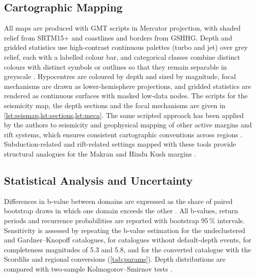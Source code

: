 \documentclass[11pt]{article}
\begin{document}
\subsection{Cartographic Mapping}
All maps are produced with GMT scripts in Mercator projection, with shaded relief
from SRTM15+ and coastlines and borders from GSHHG. Depth and gridded statistics use
high-contrast continuous palettes (turbo and jet) over grey relief, each with a
labelled colour bar, and categorical classes combine distinct colours with distinct
symbols or outlines so that they remain separable in greyscale \cite{Crameri2020}. Hypocentres are coloured by depth and sized by magnitude, focal
mechanisms are drawn as lower-hemisphere projections, and gridded statistics are
rendered as continuous surfaces with masked low-data nodes. The scripts for the
seismicity map, the depth sections and the focal mechanisms are given in
\cref{lst:seismap,lst:sections,lst:meca}. The same scripted
approach has been applied by the authors to seismicity and geophysical mapping of
other active margins and rift systems, which ensures consistent cartographic
conventions across regions \cite{Wessel2019, Wessel1996, Lemenkova202218,
Tozer2019, Runfola2020, Lemenkova202205, Hunter2007, Harris2020, Lemenkova202215,
Virtanen2020, McKinney2010}. Subduction-related and rift-related settings mapped
with these tools provide structural analogues for the Makran and Hindu Kush
margins \cite{Talebian2004, Jackson1988, Lemenkova202127, Frohlich1992,
Ekstrom2012, Lemenkova202104, Dziewonski1981, Bird2003, Lemenkova202220,
Styron2020, Kagan2002}.

\subsection{Statistical Analysis and Uncertainty}
Differences in b-value between domains are expressed as the share of paired bootstrap
draws in which one domain exceeds the other \cite{Shi1982, Woessner2005}. All
b-values, return periods and recurrence probabilities are reported with bootstrap
95\,\% intervals. Sensitivity is assessed by repeating the b-value estimation for
the undeclustered and Gardner--Knopoff catalogues, for catalogues without
default-depth events, for completeness magnitudes of 5.3 and 5.8, and for the
converted catalogue with the Scordilis and regional conversions (\cref{tab:params}).
Depth distributions are compared with two-sample Kolmogorov--Smirnov tests
\cite{Virtanen2020}.
\end{document}
